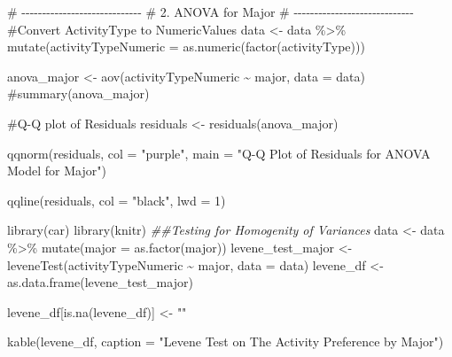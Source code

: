 \documentclass[
  letterpaper,
  DIV=11,
  numbers=noendperiod]{scrartcl}
\newenvironment{Shaded}{\begin{snugshade}}{\end{snugshade}}
\newcommand{\AttributeTok}[1]{\textcolor[rgb]{0.40,0.45,0.13}{#1}}
\newcommand{\CommentTok}[1]{\textcolor[rgb]{0.37,0.37,0.37}{#1}}
\newcommand{\DecValTok}[1]{\textcolor[rgb]{0.68,0.00,0.00}{#1}}
\newcommand{\DocumentationTok}[1]{\textcolor[rgb]{0.37,0.37,0.37}{\textit{#1}}}
\newcommand{\FunctionTok}[1]{\textcolor[rgb]{0.28,0.35,0.67}{#1}}
\newcommand{\NormalTok}[1]{\textcolor[rgb]{0.00,0.23,0.31}{#1}}
\newcommand{\OtherTok}[1]{\textcolor[rgb]{0.00,0.23,0.31}{#1}}
\newcommand{\SpecialCharTok}[1]{\textcolor[rgb]{0.37,0.37,0.37}{#1}}
\newcommand{\StringTok}[1]{\textcolor[rgb]{0.13,0.47,0.30}{#1}}
\begin{document}
\begin{Shaded}
\begin{Highlighting}[]
\CommentTok{\# {-}{-}{-}{-}{-}{-}{-}{-}{-}{-}{-}{-}{-}{-}{-}{-}{-}{-}{-}{-}{-}{-}{-}{-}{-}{-}{-}{-}{-}}
\CommentTok{\# 2. ANOVA for Major}
\CommentTok{\# {-}{-}{-}{-}{-}{-}{-}{-}{-}{-}{-}{-}{-}{-}{-}{-}{-}{-}{-}{-}{-}{-}{-}{-}{-}{-}{-}{-}{-}}
\CommentTok{\#Convert ActivityType to NumericValues}
\NormalTok{data }\OtherTok{\textless{}{-}}\NormalTok{ data }\SpecialCharTok{\%\textgreater{}\%} \FunctionTok{mutate}\NormalTok{(}\AttributeTok{activityTypeNumeric =} \FunctionTok{as.numeric}\NormalTok{(}\FunctionTok{factor}\NormalTok{(activityType)))}

\NormalTok{anova\_major }\OtherTok{\textless{}{-}} \FunctionTok{aov}\NormalTok{(activityTypeNumeric }\SpecialCharTok{\textasciitilde{}}\NormalTok{ major, }\AttributeTok{data =}\NormalTok{ data)}
\CommentTok{\#summary(anova\_major)}

\CommentTok{\#Q{-}Q plot of Residuals}
\NormalTok{residuals }\OtherTok{\textless{}{-}} \FunctionTok{residuals}\NormalTok{(anova\_major)}

\FunctionTok{qqnorm}\NormalTok{(residuals, }\AttributeTok{col =} \StringTok{"purple"}\NormalTok{, }\AttributeTok{main =} \StringTok{"Q{-}Q Plot of Residuals for ANOVA Model}
\StringTok{       for Major"}\NormalTok{)}

\FunctionTok{qqline}\NormalTok{(residuals, }\AttributeTok{col =} \StringTok{"black"}\NormalTok{, }\AttributeTok{lwd =} \DecValTok{1}\NormalTok{)}
\end{Highlighting}
\end{Shaded}

\begin{Shaded}
\begin{Highlighting}[]
\FunctionTok{library}\NormalTok{(car)}
\FunctionTok{library}\NormalTok{(knitr)}
\DocumentationTok{\#\#Testing for Homogenity of Variances}
\NormalTok{data }\OtherTok{\textless{}{-}}\NormalTok{ data }\SpecialCharTok{\%\textgreater{}\%}
  \FunctionTok{mutate}\NormalTok{(}\AttributeTok{major =} \FunctionTok{as.factor}\NormalTok{(major))}
\NormalTok{levene\_test\_major }\OtherTok{\textless{}{-}} \FunctionTok{leveneTest}\NormalTok{(activityTypeNumeric }\SpecialCharTok{\textasciitilde{}}\NormalTok{ major, }\AttributeTok{data =}\NormalTok{ data)}
\NormalTok{levene\_df }\OtherTok{\textless{}{-}} \FunctionTok{as.data.frame}\NormalTok{(levene\_test\_major)}

\NormalTok{levene\_df[}\FunctionTok{is.na}\NormalTok{(levene\_df)] }\OtherTok{\textless{}{-}} \StringTok{""}

\FunctionTok{kable}\NormalTok{(levene\_df, }\AttributeTok{caption =} \StringTok{"Levene Test on The Activity Preference by Major"}\NormalTok{)}
\end{Highlighting}
\end{Shaded}
\end{document}
